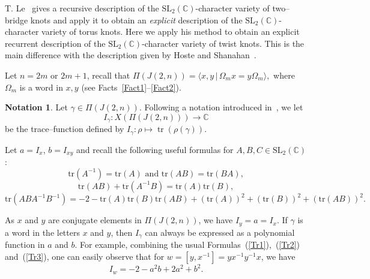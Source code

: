 \documentclass[a4paper]{amsart}
\theoremstyle{plain}
\theoremstyle{definition}
\newtheorem*{notation*}{Notation}
\theoremstyle{remark}
\newcommand{\C}{{\mathbb C}}
\newcommand{\CC}{{\mathbb C}}
\newcommand{\SL}{{\mathrm{SL}_2(\C)}}
\newcommand{\tr}{\mathop{\mathrm{tr}}\nolimits}
\begin{document}
T. Le~\cite{Le} gives a recursive description of the $\SL$-character variety of two--bridge knots and apply it to obtain an \emph{explicit} description of the $\SL$-character variety of torus knots. 
Here we apply his method to obtain an explicit recurrent description of the $\SL$-character variety of twist knots. This is the main difference with the description given by Hoste and Shanahan~\cite{HS}.
    

Let $n = 2m$ or $2m+1$, recall that 
$\Pi(J(2,n))=\langle x,y \,|\, \Omega_m x=y \Omega_m \rangle,$
where $\Omega_m$ is a word in $x, y$ (see Facts~\ref{Fact1}--\ref{Fact2}).

\begin{notation*}
Let $\gamma \in \Pi(J(2,n))$. Following a notation introduced in~\cite{DehnSurgery}, we let 
$$I_\gamma : X(\Pi(J(2,n))) \to \CC$$ 
be the trace--function defined by $I_\gamma : \rho \mapsto \tr(\rho(\gamma))$.
\end{notation*}

Let $a=I_x$, $b=I_{xy}$ and recall the following useful formulas for $A,B,C \in \SL$:
\begin{equation}\label{Tr1}
\mathrm{tr}(A^{-1}) = \mathrm{tr}(A) \text{ and } \mathrm{tr}(AB) = \mathrm{tr}(BA),
\end{equation}
\begin{equation}\label{Tr2}
\mathrm{tr}(AB) + \mathrm{tr}(A^{-1}B) = \mathrm{tr}(A)\mathrm{tr}(B),
\end{equation}
\begin{equation}\label{Tr3}
\mathrm{tr}(ABA^{-1}B^{-1}) = -2 - \mathrm{tr}(A)\mathrm{tr}(B)\mathrm{tr}(AB) + (\mathrm{tr}(A))^2 +(\mathrm{tr}(B))^2+(\mathrm{tr}(AB))^2.
\end{equation}

As $x$ and $y$ are conjugate elements in $\Pi(J(2,n))$, we have $I_y = a = I_x$.
If $\gamma$ is a word in the letters $x$ and $y$, then $I_\gamma$ can always be expressed as a polynomial function  in $a$ and $b$. For example, combining the usual Formulas~(\ref{Tr1}),~(\ref{Tr2}) and~(\ref{Tr3}), one can easily observe that for $w=[y, x^{-1}]=yx^{-1}y^{-1}x$, we have
\begin{equation}\label{I_w}
I_w = -2 - a^2b + 2a^2+b^2.
\end{equation}
\end{document}
